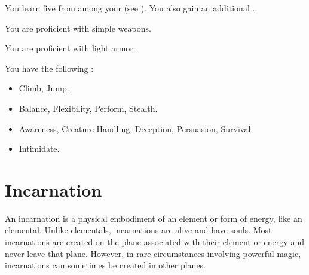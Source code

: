       You learn five  from among your  (see ). You also gain an additional .

      You are proficient with simple weapons.

      You are proficient with light armor.

      You have the following :
      \begin{itemize}
        \item {} Climb, Jump.
        \item {} Balance, Flexibility, Perform, Stealth.
        \item {} Awareness, Creature Handling, Deception, Persuasion, Survival.
        \item {} Intimidate.
      \end{itemize}

\section{Incarnation}

  An incarnation is a physical embodiment of an element or form of energy, like an elemental.
  Unlike elementals, incarnations are alive and have souls.
  Most incarnations are created on the plane associated with their element or energy and never leave that plane.
  However, in rare circumstances involving powerful magic, incarnations can sometimes be created in other planes.

